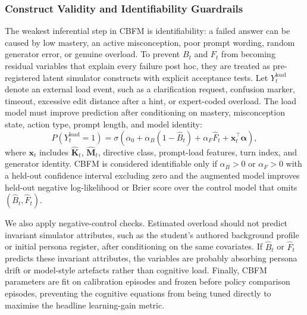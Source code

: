 \documentclass[11pt,a4paper]{report}
\begin{document}
\subsubsection{Construct Validity and Identifiability Guardrails}
The weakest inferential step in CBFM is identifiability: a failed answer can be caused by low mastery, an active misconception, poor prompt wording, random generator error, or genuine overload. To prevent $B_t$ and $F_t$ from becoming residual variables that explain every failure post hoc, they are treated as pre-registered latent simulator constructs with explicit acceptance tests. Let $Y^{\text{load}}_t$ denote an external load event, such as a clarification request, confusion marker, timeout, excessive edit distance after a hint, or expert-coded overload. The load model must improve prediction after conditioning on mastery, misconception state, action type, prompt length, and model identity:
\begin{equation}
    P(Y^{\text{load}}_t=1)
    =
    \sigma\left(
        \alpha_0
        + \alpha_B(1-\hat{B}_t)
        + \alpha_F\hat{F}_t
        + \mathbf{x}_t^\top\boldsymbol{\alpha}
    \right),
\end{equation}
where $\mathbf{x}_t$ includes $\hat{\mathbf{K}}_t$, $\hat{\mathbf{M}}_t$, directive class, prompt-load features, turn index, and generator identity. CBFM is considered identifiable only if $\alpha_B>0$ or $\alpha_F>0$ with a held-out confidence interval excluding zero and the augmented model improves held-out negative log-likelihood or Brier score over the control model that omits $(\hat{B}_t,\hat{F}_t)$.

We also apply negative-control checks. Estimated overload should not predict invariant simulator attributes, such as the student's authored background profile or initial persona register, after conditioning on the same covariates. If $\hat{B}_t$ or $\hat{F}_t$ predicts these invariant attributes, the variables are probably absorbing persona drift or model-style artefacts rather than cognitive load. Finally, CBFM parameters are fit on calibration episodes and frozen before policy comparison episodes, preventing the cognitive equations from being tuned directly to maximise the headline learning-gain metric.
\end{document}
